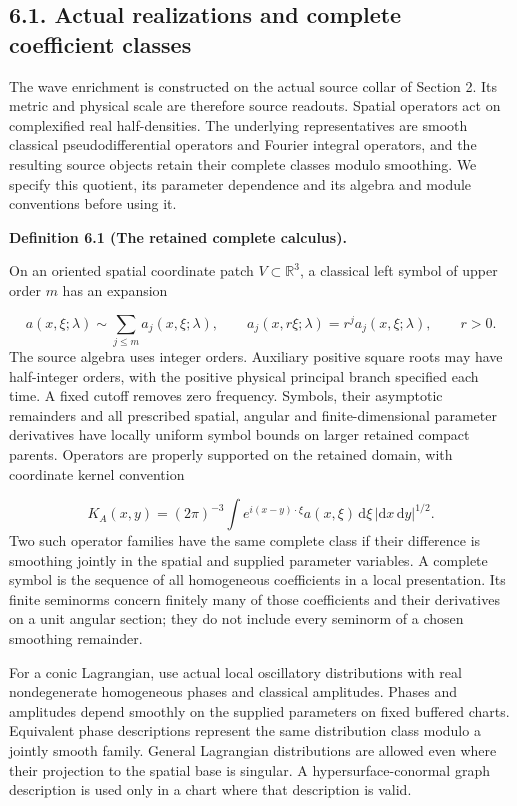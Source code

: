 \documentclass[
  english,
  11pt,
  reqno]{amsart}
\makeatletter
\newcommand{\pandocstatementheading}[1]{%
  \par\addpenalty{\@beginparpenalty}%
  \addvspace{.5\baselineskip plus .2\baselineskip minus .2\baselineskip}%
  {\normalfont\bfseries #1\par}%
  \nobreak\@afterindenttrue\@afterheading
}
\makeatother
\begin{document}
\subsection{6.1. Actual realizations and complete coefficient
classes}\label{actual-realizations-and-complete-coefficient-classes}\label{sec:online-complete-wave-calculus}

The wave enrichment is constructed on the actual source collar of
Section 2. Its metric and physical scale are therefore source readouts.
Spatial operators act on complexified real half-densities. The
underlying representatives are smooth classical pseudodifferential
operators and Fourier integral operators, and the resulting source
objects retain their complete classes modulo smoothing. We specify this
quotient, its parameter dependence and its algebra and module
conventions before using it.

\pandocstatementheading{\leavevmode{}\label{def:online-complete-symbol-calculus}Definition 6.1 (The retained complete calculus).}

On an oriented spatial coordinate patch \(V\subset\mathbb R^3\), a
classical left symbol of upper order \(m\) has an expansion

\label{eq:online-classical-symbol-convention} \[
a(x,\xi;\lambda)\sim\sum_{j\le m}a_j(x,\xi;\lambda),
\qquad a_j(x,r\xi;\lambda)=r^j a_j(x,\xi;\lambda),
\qquad r>0.
\] The source algebra uses integer orders. Auxiliary positive square
roots may have half-integer orders, with the positive physical principal
branch specified each time. A fixed cutoff removes zero frequency.
Symbols, their asymptotic remainders and all prescribed spatial, angular
and finite-dimensional parameter derivatives have locally uniform symbol
bounds on larger retained compact parents. Operators are properly
supported on the retained domain, with coordinate kernel convention

\label{eq:online-physical-operator-kernel} \[
K_A(x,y)=(2\pi)^{-3}
\int e^{i(x-y)\cdot\xi}a(x,\xi)\,\mathrm d\xi
\,|\mathrm dx\,\mathrm dy|^{1/2}.
\] Two such operator families have the same complete class if their
difference is smoothing jointly in the spatial and supplied parameter
variables. A complete symbol is the sequence of all homogeneous
coefficients in a local presentation. Its finite seminorms concern
finitely many of those coefficients and their derivatives on a unit
angular section; they do not include every seminorm of a chosen
smoothing remainder.

For a conic Lagrangian, use actual local oscillatory distributions with
real nondegenerate homogeneous phases and classical amplitudes. Phases
and amplitudes depend smoothly on the supplied parameters on fixed
buffered charts. Equivalent phase descriptions represent the same
distribution class modulo a jointly smooth family. General Lagrangian
distributions are allowed even where their projection to the spatial
base is singular. A hypersurface-conormal graph description is used only
in a chart where that description is valid.
\end{document}
